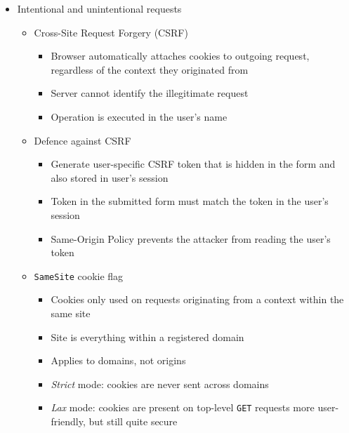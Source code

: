 \documentclass[12pt,titlepage,a4paper]{report}
\begin{document}
\begin{itemize}
				\item Intentional and unintentional requests
				\begin{itemize}
					\item Cross-Site Request Forgery (CSRF)
					\begin{itemize}
						\item Browser automatically attaches cookies to outgoing request, regardless of the context they originated from
						\item Server cannot identify the illegitimate request
						\item Operation is executed in the user's name
					\end{itemize}
					\item Defence against CSRF
					\begin{itemize}
						\item Generate user-specific CSRF token that is hidden in the form and also stored in user's session
						\item Token in the submitted form must match the token in the user's session
						\item Same-Origin Policy prevents the attacker from reading the user's token
					\end{itemize}
					\item \texttt{SameSite} cookie flag
					\begin{itemize}
						\item Cookies only used on requests originating from a context within the same site
						\item Site is everything within a registered domain
						\item Applies to domains, not origins
						\item \emph{Strict} mode: cookies are never sent across domains
						\item \emph{Lax} mode: cookies are present on top-level \texttt{GET} requests
							\subitem more user-friendly, but still quite secure
					\end{itemize}
				\end{itemize}
				

\end{itemize}
\end{document}

